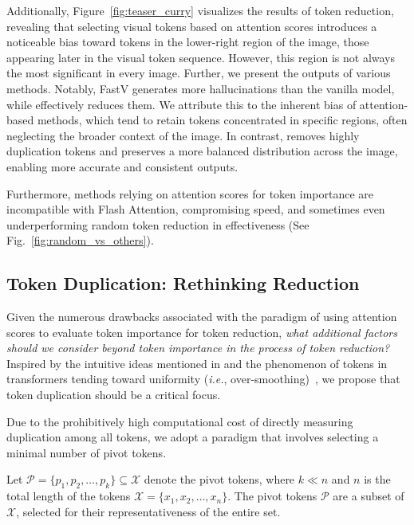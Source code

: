 \vspace{-2mm}
Additionally, Figure~\ref{fig:teaser_curry} visualizes the results of token reduction, revealing that selecting visual tokens based on attention scores introduces a noticeable bias toward tokens in the lower-right region of the image, those appearing later in the visual token sequence. However, this region is not always the most significant in every image. Further, we present the outputs of various methods. Notably, FastV generates more hallucinations than the vanilla model, while \algname effectively reduces them. 
We attribute this to the inherent bias of attention-based methods, which tend to retain tokens concentrated in specific regions, often neglecting the broader context of the image. In contrast, \algname removes highly duplication tokens and preserves a more balanced distribution across the image, enabling more accurate and consistent outputs.

Furthermore, methods relying on attention scores for token importance are incompatible with Flash Attention, compromising speed, and sometimes even underperforming random token reduction in effectiveness (See Fig.~\ref{fig:random_vs_others}).


\subsection{Token Duplication: Rethinking Reduction}
Given the numerous drawbacks associated with the paradigm of using attention scores to evaluate token importance for token reduction, \textit{what additional factors should we consider beyond token importance in the process of token reduction?}
Inspired by the intuitive ideas mentioned in  and the phenomenon of tokens in transformers tending toward uniformity (\emph{i.e.}, over-smoothing)~\citep{nguyen2023mitigating, gong2021vision}, we propose that token duplication should be a critical focus.

Due to the prohibitively high computational cost of directly measuring duplication among all tokens, we adopt a paradigm that involves selecting a minimal number of pivot tokens.
\begin{definition}
Let $ \mathcal{P} = \{p_1, p_2, \dots, p_k\} \subseteq \mathcal{X} $ denote the  pivot tokens, where $ k \ll n $ and $ n $ is the total length of the tokens $ \mathcal{X} = \{x_1, x_2, \dots, x_n\}$. The pivot tokens $\mathcal{P}$ are a subset of $ \mathcal{X} $, selected for their representativeness of the entire set.
\end{definition}

